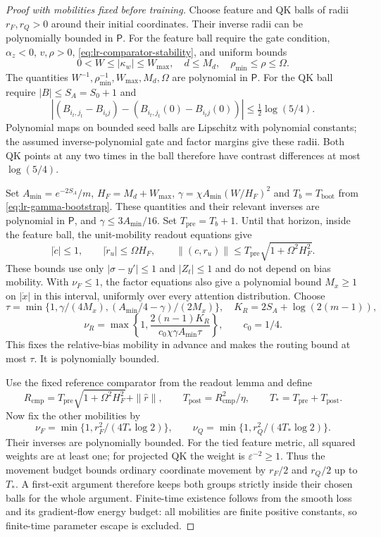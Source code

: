 \begin{proof}[Proof with mobilities fixed before training]
Choose feature and QK balls of radii $r_F,r_Q>0$ around their initial
coordinates. Their inverse radii can be polynomially bounded in $\mathsf P$.
For the feature ball require the gate condition, $\alpha_z<0$, $v,\rho>0$,
\eqref{eq:lr-comparator-stability}, and uniform bounds
\[
 0<W\le|\kappa_w|\le W_{\max},\quad d\le M_d,\quad
 \rho_{\min}\le\rho\le\Omega.
\]
The quantities $W^{-1},\rho_{\min}^{-1},W_{\max},M_d,\Omega$ are
polynomial in $\mathsf P$. For the QK ball require $|B|\le S_A=S_0+1$ and
\[
 |(B_{i_t,j_t}-B_{i_tj})-(B_{i_t,j_t}(0)-B_{i_tj}(0))|
 \le\tfrac12\log(5/4).
\]
Polynomial maps on bounded seed balls are Lipschitz with polynomial
constants; the assumed inverse-polynomial gate and factor margins give
these radii. Both QK points at any two times in the ball therefore have
contrast differences at most $\log(5/4)$.

Set $A_{\min}=e^{-2S_A}/m$, $H_F=M_d+W_{\max}$,
$\gamma=\chi A_{\min}(W/H_F)^2$ and $T_b=T_{\mathrm{boot}}$ from
\eqref{eq:lr-gamma-bootstrap}. These quantities and their relevant
inverses are polynomial in $\mathsf P$, and $\gamma\le3A_{\min}/16$.
Set $T_{\mathrm{pre}}=T_b+1$. Until that horizon, inside the feature
ball, the unit-mobility readout equations give
\[
 |\dot c|\le1,\qquad |\dot r_u|\le\Omega H_F,
 \qquad \|(c,r_u)\|\le T_{\mathrm{pre}}\sqrt{1+\Omega^2H_F^2}.
\]
These bounds use only $|\sigma-y'|\le1$ and $|Z_t|\le1$ and do not
depend on bias mobility. With $\nu_F\le1$, the factor equations also
give a polynomial bound $M_x\ge1$ on $|\dot x|$ in this interval,
uniformly over every attention distribution. Choose
\[
 \tau=\min\{1,\gamma/(4M_x),(A_{\min}/4-\gamma)/(2M_x)\},
 \quad K_R=2S_A+\log(2(m-1)),
\]
\[
 \nu_R=\max\left\{1,
 \frac{2(n-1)K_R}{c_0\chi\gamma A_{\min}\tau}\right\},
 \qquad c_0=1/4.
\]
This fixes the relative-bias mobility in advance and makes the routing
bound at most $\tau$. It is polynomially bounded.

Use the fixed reference comparator from the readout lemma and define
\[
 R_{\mathrm{cmp}}=T_{\mathrm{pre}}\sqrt{1+\Omega^2H_F^2}+\|\widehat r\|,
 \qquad T_{\mathrm{post}}=R_{\mathrm{cmp}}^2/\eta,\qquad
 T_*=T_{\mathrm{pre}}+T_{\mathrm{post}}.
\]
Now fix the other mobilities by
\[
 \nu_F=\min\{1,r_F^2/(4T_*\log2)\},\qquad
 \nu_Q=\min\{1,r_Q^2/(4T_*\log2)\}.
\]
Their inverses are polynomially bounded. For the tied feature metric,
all squared weights are at least one; for projected QK the weight is
$\varepsilon^{-2}\ge1$. Thus the movement budget bounds ordinary
coordinate movement by $r_F/2$ and $r_Q/2$ up to $T_*$.
A first-exit argument therefore keeps both groups strictly inside their
chosen balls for the whole argument. Finite-time existence follows from
the smooth loss and its gradient-flow energy budget: all mobilities are
finite positive constants, so finite-time parameter escape is excluded.


\end{proof}
